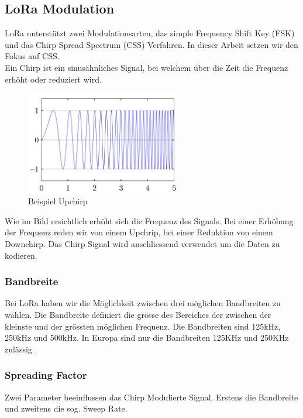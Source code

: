 \documentclass[11pt,english,german]{report}
\theoremstyle{definition}
\begin{document}
\subsection{LoRa Modulation}
LoRa unterstützt zwei Modulationsarten, das simple Frequency Shift Key (FSK) und das Chirp Spread Spectrum (CSS) Verfahren. In dieser Arbeit setzen wir den Fokus auf CSS.\\[0.3cm]
Ein Chirp ist ein sinusähnliches Signal, bei welchem über die Zeit die Frequenz erhöht oder reduziert wird.
\begin{figure}[H]
	\centering
	\includegraphics[width=0.6\textwidth]{img/lora/upchirp.png}
	\caption[Beispiel Upchirp]
	{Beispiel Upchirp}
\end{figure}
\noindent
Wie im Bild ersichtlich erhöht sich die Frequenz des Signals. Bei einer Erhöhung der Frequenz reden wir von einem Upchrip, bei einer Reduktion von einem Downchirp. Das Chirp Signal wird anschliessend verwendet um die Daten zu kodieren.

\subsubsection{Bandbreite}
Bei LoRa haben wir die Möglichkeit zwischen drei möglichen Bandbreiten zu wählen. Die Bandbreite definiert die grösse des Bereiches der zwischen der kleinste und der grössten möglichen Frequenz. Die Bandbreiten sind 125kHz, 250kHz und 500kHz. In Europa sind nur die Bandbreiten 125KHz und 250KHz zulässig \cite{lorabandwitdh}. 

\newpage
\subsubsection{Spreading Factor}
Zwei Parameter beeinflussen das Chirp Modulierte Signal. Erstens die Bandbreite und zweitens die sog. Sweep Rate.
\end{document}
